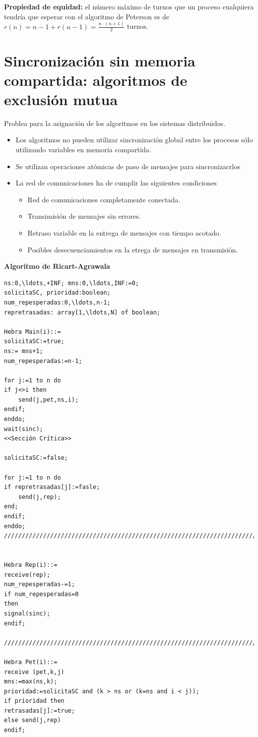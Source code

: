 \documentclass[a4paper,11pt]{article}
\begin{document}
\textbf{Propiedad de equidad:} el número máximo de turnos que un proceso cualquiera tendría que esperar con el algoritmo de Peterson es de $r(n)=n-1+r(n-1) = \frac{n\cdot(n+1)}{2}$ turnos.

\section{Sincronización sin memoria compartida: algoritmos de exclusión mutua}
Problea para la asignación de los algoritmos en los sistemas distribuidos.

\begin{itemize}
\item Los algoritmos no pueden utilizar sincronización global entre los procesos sólo utilizando variables en memoria compartida.

\item Se utilizan operaciones atómicas de paso de mensajes para sincronizacrlos

\item La red de comunicaciones ha de cumplir las siguientes condiciones

	\begin{itemize}
		\item Red de comunicaciones completamente conectada.
		\item Transimisión de mensajes sin errores.
		\item Retraso variable en la entrega de mensajes con tiempo acotado.
		\item Posibles desecuenciamientos en la etrega de mensajes en transmisión.
	\end{itemize}
\end{itemize}

\textbf{Algoritmo de Ricart-Agrawala}
\begin{verbatim}
ns:0,\ldots,+INF; mns:0,\ldots,INF:=0;
solicitaSC, prioridad:boolean;
num_repesperadas:0,\ldots,n-1;
repretrasadas: array[1,\ldots,N] of boolean;

Hebra Main(i)::=
solicitaSC:=true;
ns:= mns+1;
num_repesperadas:=n-1;

for j:=1 to n do
if j<>i then
	send(j,pet,ns,i);
endif;
enddo;
wait(sinc);
<<Sección Crítica>>

solicitaSC:=false;

for j:=1 to n do
if repretrasadas[j]:=fasle;
	send(j,rep);
end;
endif;
enddo;
/////////////////////////////////////////////////////////////////////////


Hebra Rep(i)::=
receive(rep);
num_repesperadas-=1;
if num_repesperadas=0
then
signal(sinc);
endif;

/////////////////////////////////////////////////////////////////////////

Hebra Pet(i)::=
receive (pet,k,j)
mns:=max(ns,k);
prioridad:=solicitaSC and (k > ns or (k=ns and i < j));
if prioridad then
retrasadas[j]:=true;
else send(j,rep)
endif;
\end{verbatim}
\end{document}
